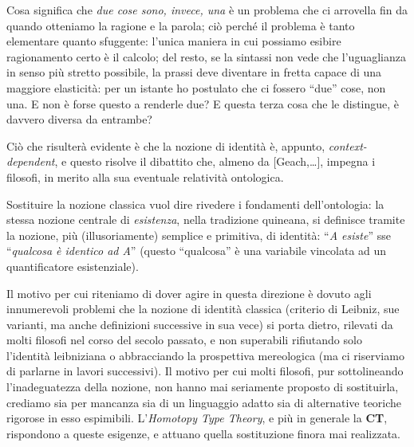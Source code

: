 	Cosa significa che \emph{due cose sono, invece, una} è un problema che ci arrovella fin da quando otteniamo la ragione e la parola; ciò perché il problema è tanto elementare quanto sfuggente: l'unica maniera in cui possiamo esibire ragionamento certo è il calcolo; del resto, se la sintassi non vede che l'uguaglianza in senso più stretto possibile, la prassi deve diventare in fretta capace di una maggiore elasticità: per un istante ho postulato che ci fossero ``due'' cose, non una. E non è forse questo a renderle due? E questa terza cosa che le distingue, è davvero diversa da entrambe?
	
	Ciò che risulterà evidente è che la nozione di identità è, appunto, \emph{context-dependent}, e questo risolve il dibattito che, almeno da [Geach,\dots], impegna i filosofi, in merito alla sua eventuale relatività ontologica. 
	
	Sostituire la nozione classica vuol dire rivedere i fondamenti dell'ontologia: la stessa nozione centrale di \emph{esistenza}, nella tradizione quineana, si definisce tramite la nozione, più (illusoriamente) semplice e primitiva, di identità: ``\textit{A esiste}'' sse ``\textit{qualcosa è identico ad A}'' (questo ``qualcosa'' è una variabile vincolata ad un quantificatore esistenziale).
	
	Il motivo per cui riteniamo di dover agire in questa direzione è dovuto agli innumerevoli problemi che la nozione di identità classica (criterio di Leibniz, sue varianti, ma anche definizioni successive in sua vece) si porta dietro, rilevati da molti filosofi nel corso del secolo passato, e non superabili rifiutando solo l'identità leibniziana o abbracciando la prospettiva mereologica (ma ci riserviamo di parlarne in lavori successivi). Il motivo per cui molti filosofi, pur sottolineando l'inadeguatezza della nozione, non hanno mai seriamente proposto di sostituirla, crediamo sia per mancanza sia di un linguaggio adatto sia di alternative teoriche rigorose in esso espimibili.
	L'\textit{Homotopy Type Theory}, e più in generale la \textbf{CT}, rispondono a queste esigenze, e attuano quella sostituzione finora mai realizzata. \endfo
	
